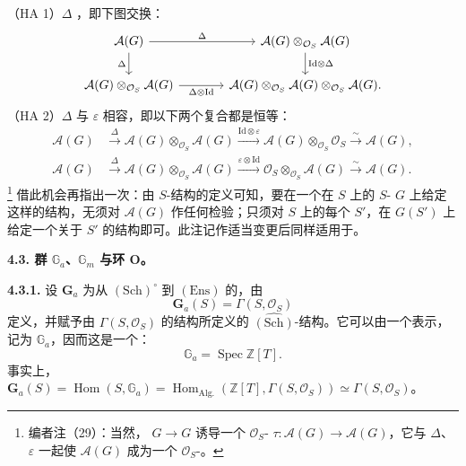 （HA 1）$\Delta$ ，即下图交换：
\[
\begin{tikzcd}[column sep=large]
\mathcal A(G)\arrow[r,"{\Delta}"]\arrow[d,"{\Delta}"']&\mathcal A(G)\otimes_{\mathcal O_S}\mathcal A(G)\arrow[d,"{\mathrm{Id}\otimes\Delta}"]\\
\mathcal A(G)\otimes_{\mathcal O_S}\mathcal A(G)\arrow[r,"{\Delta\otimes\mathrm{Id}}"']&\mathcal A(G)\otimes_{\mathcal O_S}\mathcal A(G)\otimes_{\mathcal O_S}\mathcal A(G).
\end{tikzcd}
\]
（HA 2）$\Delta$ 与 $\varepsilon$ 相容，即以下两个复合都是恒等：
\[
\begin{aligned}
\mathcal A(G)&\xrightarrow\Delta\mathcal A(G)\otimes_{\mathcal O_S}\mathcal A(G)\xrightarrow{\mathrm{Id}\otimes\varepsilon}\mathcal A(G)\otimes_{\mathcal O_S}\mathcal O_S\xrightarrow\sim\mathcal A(G),\\
\mathcal A(G)&\xrightarrow\Delta\mathcal A(G)\otimes_{\mathcal O_S}\mathcal A(G)\xrightarrow{\varepsilon\otimes\mathrm{Id}}\mathcal O_S\otimes_{\mathcal O_S}\mathcal A(G)\xrightarrow\sim\mathcal A(G).
\end{aligned}
\]
\footnote{编者注（29）：当然， $G\to G$ 诱导一个 $\mathcal O_S$- $\tau:\mathcal A(G)\to\mathcal A(G)$，它与 $\Delta$、$\varepsilon$ 一起使 $\mathcal A(G)$ 成为一个 $\mathcal O_S$-。}
借此机会再指出一次：由 $S$-结构的定义可知，要在一个在 $S$ 上的 $S$- $G$ 上给定这样的结构，无须对 $\mathcal A(G)$ 作任何检验；只须对 $S$ 上的每个 $S'$，在 $G(S')$ 上给定一个关于 $S'$ 的结构即可。此注记作适当变更后同样适用于。

\textbf{4.3. 群 $\mathbb G_a$、$\mathbb G_m$ 与环 $\mathbf O$。}

\textbf{4.3.1.} 设 $\mathbf G_a$ 为从 $(\mathrm{Sch})^\circ$ 到 $(\mathrm{Ens})$ 的，由
\[
\mathbf G_a(S)=\Gamma(S,\mathcal O_S)
\]
定义，并赋予由 $\Gamma(S,\mathcal O_S)$ 的结构所定义的 $\widehat{(\mathrm{Sch})}$-结构。它可以由一个表示，记为 $\mathbb G_a$，因而这是一个：
\[
\mathbb G_a=\operatorname{Spec}\mathbb Z[T].
\]
事实上，$\mathbf G_a(S)=\operatorname{Hom}(S,\mathbb G_a)=\operatorname{Hom}_{\mathrm{Alg.}}(\mathbb Z[T],\Gamma(S,\mathcal O_S))\simeq\Gamma(S,\mathcal O_S)$。

